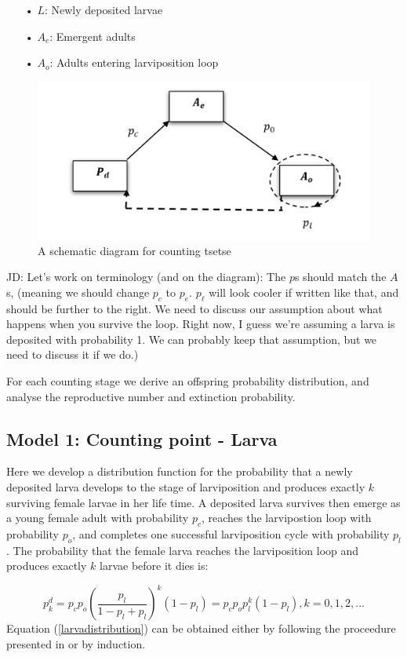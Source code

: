 \begin{itemize}
\item[•] $L$: Newly deposited larvae
\item[•] $A_{e}$: Emergent adults
\item[•] $A_{o}$: Adults entering larviposition loop
\end{itemize}
\begin{figure}[hbt!]
	\centering
	\includegraphics[width=0.7\linewidth]{Tsetseflowchat3.png}
	\caption{A schematic diagram for counting tsetse}
	\label{fig:flowchart}
\end{figure}

JD: Let's work on terminology (and on the diagram): The $p$s should match the $A$s, (meaning we should change $p_c$ to $p_e$. $p_\ell$ will look cooler if written like that, and should be further to the right. We need to discuss our assumption about what happens when you survive the loop. Right now, I guess we're assuming a larva is deposited with probability 1. We can probably keep that assumption, but we need to discuss it if we do.)

For each counting stage we derive an offspring probability distribution, and analyse the reproductive number and extinction probability.    

\subsection{Model 1: Counting point - Larva}

Here we develop a distribution function for the probability that a newly deposited larva develops to the stage of larviposition and produces exactly $k$ surviving female larvae in her life time. A deposited larva survives then emerge as a young female adult with probability $p_{c}$, reaches the larvipostion loop with probability $p_o$, and completes one successful larviposition cycle with probability $p_{l}$. The probability that the female larva reaches the larviposition loop and produces exactly $k$ larvae before it dies is:

\begin{equation}
\label{larvadistribution}
p_{k}^{d} = p_{c}p_{o}(\frac{p_{l}}{1-p_{l} + p_{l}})^{k}(1-p_{l})= p_{c}p_{o}p_{l}^{k}(1-p_{l}), k =0,1,2,...
\end{equation} 
Equation (\ref{larvadistribution}) can be obtained either by following the proceedure presented in \cite{Kajunguri2019} or by induction.\\

